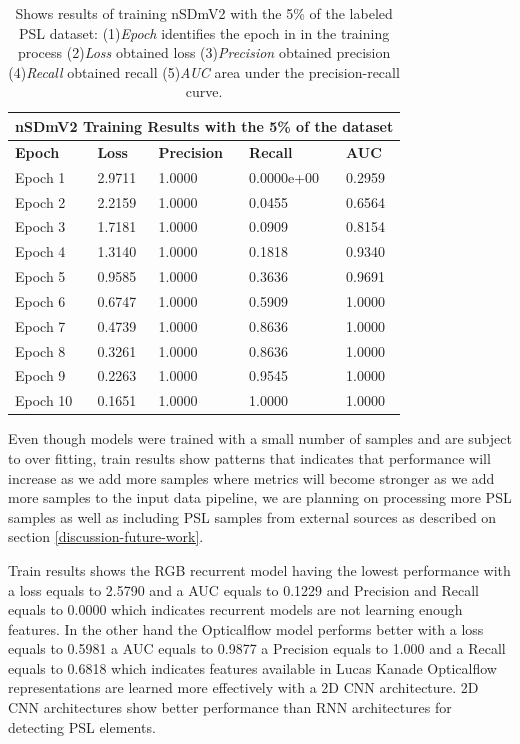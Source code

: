 \documentclass[twocolumn,conference]{article}
\begin{document}
\begin{table}
\captionsetup{font=footnotesize}
\centering
\begin{tabular}{ p{2.8cm} p{2.8cm} p{2.8cm} p{2.8cm} p{2.8cm} }
\toprule 
\multicolumn{5}{c}{\textbf{nSDmV2 Training Results with the 5\% of the dataset}} \\
\hline
\hline
\textbf{Epoch}&	\textbf{Loss}	&\textbf{Precision}	&\textbf{Recall}	&\textbf{AUC} \\
\hline
\midrule
Epoch 1&	2.9711&	1.0000&	0.0000e+00&	0.2959\\
Epoch 2&	2.2159&	1.0000&	0.0455&	0.6564\\
Epoch 3&	1.7181&	1.0000&	0.0909&	0.8154\\
Epoch 4&	1.3140&	1.0000&	0.1818&	0.9340\\
Epoch 5&	0.9585&	1.0000&	0.3636&	0.9691\\
Epoch 6&	0.6747&	1.0000&	0.5909&	1.0000\\
Epoch 7&	0.4739&	1.0000&	0.8636&	1.0000\\
Epoch 8&	0.3261&	1.0000&	0.8636&	1.0000\\
Epoch 9&	0.2263&	1.0000&	0.9545&	1.0000\\
Epoch 10&	0.1651&	1.0000&	1.0000&	1.0000\\
\bottomrule
\end{tabular}
\caption{Shows results of training nSDmV2 with the 5\% of the labeled PSL dataset: (1)\textit{Epoch} identifies the epoch in in the training process (2)\textit{Loss} obtained loss (3)\textit{Precision} obtained precision (4)\textit{Recall} obtained recall (5)\textit{AUC} area under the precision-recall curve.}
\label{tab:nSDmV2-detection-results-5-percent}
\end{table}

Even though models were trained with a small number of samples and are subject to over fitting, train results show patterns that indicates that performance will increase as we add more samples where metrics will become stronger as we add more samples to the input data pipeline, we are planning on processing more PSL samples as well as including PSL samples from external sources as described on section \ref{discussion-future-work}.

Train results shows the RGB recurrent model having the lowest performance with a loss equals to 2.5790 and a AUC equals to 0.1229 and Precision and Recall equals to 0.0000 which indicates recurrent models are not learning enough features. In the other hand the Opticalflow model performs better with a loss equals to 0.5981 a AUC equals to 0.9877 a Precision equals to 1.000 and a Recall equals to 0.6818 which indicates features available in Lucas Kanade Opticalflow representations are learned more effectively with a 2D CNN architecture. 2D CNN architectures show better performance than RNN architectures for detecting PSL elements.
\end{document}

